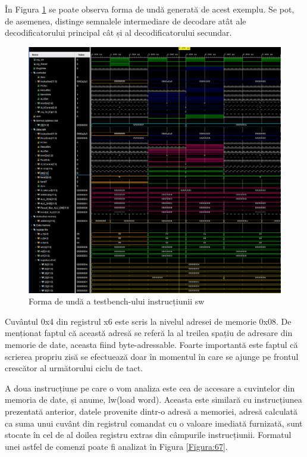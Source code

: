 \documentclass[12pt]{article}
\begin{document}
În Figura \ref{Figura:66} se poate observa forma de undă generată de acest exemplu. Se pot, de asemenea, distinge semnalele intermediare de decodare atât ale decodificatorului principal cât și al decodificatorului secundar.
\newpage

  \begin{figure}[h!]
 \hspace*{-0.1cm}\includegraphics[width=1\textwidth]{swexample.png}
 \centering
 \caption{Forma de undă a testbench-ului instrucțiunii sw}
 \label{Figura:66}
 \end{figure}
 
 Cuvântul 0x4 din registrul x6 este scris la nivelul adresei de memorie 0x08. De menționat faptul că această adresă se referă la al treilea spațiu de adresare din memorie de date, aceasta fiind byte-adressable. Foarte importantă este faptul că scrierea propriu zisă se efectuează doar în momentul în care se ajunge pe frontul crescător al următorului ciclu de tact.
 
A doua instrucțiune pe care o vom analiza este cea de accesare a cuvintelor din memoria de date, și anume, lw(load word). Aceasta este similară cu instrucțiunea prezentată anterior, datele provenite dintr-o adresă a memoriei, adresă calculată ca suma unui cuvânt din registrul comandat cu o valoare imediată furnizată, sunt stocate în cel de al doilea registru extras din câmpurile instrucțiunii. Formatul unei astfel de comenzi poate fi analizat în Figura  \ref{Figura:67}.
\end{document}
